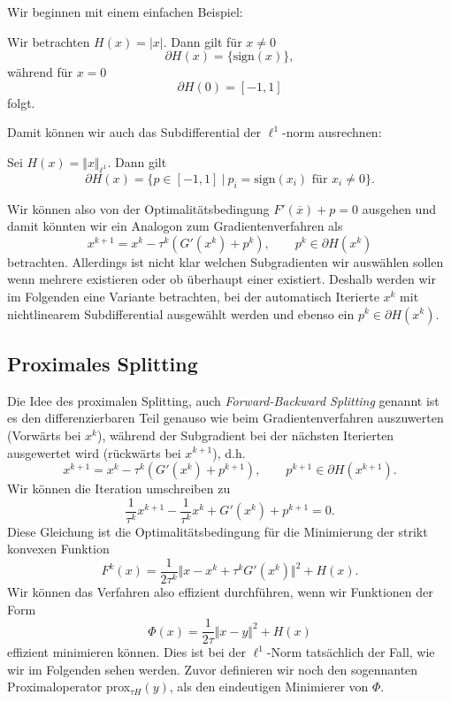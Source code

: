 Wir beginnen mit einem einfachen Beispiel:
\begin{example}{}{}
Wir betrachten $H(x) = \vert x \vert$. Dann gilt f\"ur $x \neq 0$ 
$$ \partial H(x) = \{\text{sign}(x)\}, $$
w\"ahrend f\"ur $x = 0$
$$ \partial H(0) = [-1,1] $$
folgt.
\end{example}
Damit können wir auch das Subdifferential der $\ell^1$-norm ausrechnen:
\begin{example}{}{}
Sei $H(x) = \Vert x \Vert_{\ell^1}$. Dann gilt  
$$ \partial H(x) = \{ p \in [-1,1] ~|~ p_i = \text{sign}(x_i) \text{ f\"ur } x_i \neq 0\}. $$
\end{example}

Wir können also von der Optimalit\"atsbedingung $F'(\overline{x}) + p =0$ ausgehen und damit könnten wir ein Analogon zum Gradientenverfahren als 
$$ x^{k+1} = x^k - \tau^k( G'(x^k) + p^k), \qquad p^k \in \partial H(x^k) $$
betrachten. Allerdings ist nicht klar welchen Subgradienten wir ausw\"ahlen sollen wenn mehrere existieren oder ob \"uberhaupt einer existiert. Deshalb werden wir im Folgenden eine Variante betrachten, bei der automatisch Iterierte $x^k$ mit nichtlinearem Subdifferential ausgew\"ahlt werden und ebenso ein $p^k \in \partial H(x^k)$. 

\subsection{Proximales Splitting}

Die Idee des proximalen Splitting, auch {\em Forward-Backward Splitting} genannt ist es den differenzierbaren Teil genauso wie beim Gradientenverfahren auszuwerten (Vorw\"arts bei $x^k$), w\"ahrend der Subgradient bei der n\"achsten Iterierten ausgewertet wird (r\"uckw\"arts bei $x^{k+1}$), d.h.
$$ x^{k+1} = x^k - \tau^k( G'(x^k) + p^{k+1}), \qquad p^{k+1} \in \partial H(x^{k+1}) .$$
Wir k\"onnen die Iteration umschreiben zu 
$$ \frac{1}{\tau^k} x^{k+1} - \frac{1}{\tau^k} x^k + G'(x^k) + p^{k+1} = 0. $$ 
Diese Gleichung ist die Optimalit\"atsbedingung f\"ur die Minimierung der strikt konvexen Funktion
$$ F^k(x) = \frac{1}{2 \tau^k} \Vert x - x^k + \tau^k G'(x^k) \Vert^2 + H(x) . $$
Wir k\"onnen das Verfahren also effizient durchf\"uhren, wenn wir Funktionen der Form 
$$ \Phi(x) = \frac{1}{2\tau} \Vert x - y \Vert^2 + H(x) $$
effizient minimieren k\"onnen. Dies ist bei der $\ell^1$-Norm tats\"achlich der Fall, wie wir im Folgenden sehen werden. Zuvor definieren wir noch den sogennanten Proximaloperator prox$_{\tau H}(y)$, als den eindeutigen Minimierer von $\Phi$. 

